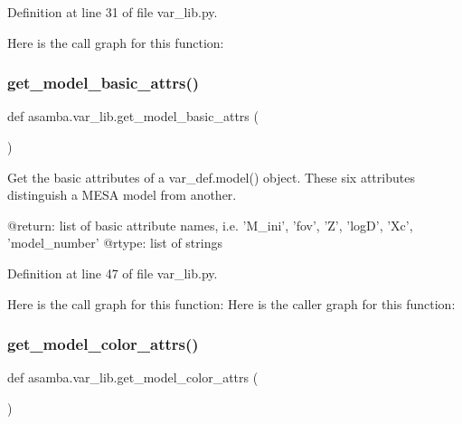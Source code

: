 Definition at line 31 of file var\+\_\+lib.\+py.

Here is the call graph for this function\+:
\mbox{\label{namespaceasamba_1_1var__lib_a300a7811388375b1f7a3267412235a28}} 
\subsubsection{\texorpdfstring{get\+\_\+model\+\_\+basic\+\_\+attrs()}{get\_model\_basic\_attrs()}}
{\footnotesize\ttfamily def asamba.\+var\+\_\+lib.\+get\+\_\+model\+\_\+basic\+\_\+attrs (\begin{DoxyParamCaption}{ }\end{DoxyParamCaption})}

\begin{DoxyVerb}Get the basic attributes of a var_def.model() object. These six attributes distinguish a MESA 
model from another.

@return: list of basic attribute names, i.e. 'M_ini', 'fov', 'Z', 'logD', 'Xc', 'model_number'
@rtype: list of strings
\end{DoxyVerb}
 

Definition at line 47 of file var\+\_\+lib.\+py.

Here is the call graph for this function\+:
Here is the caller graph for this function\+:
\mbox{\label{namespaceasamba_1_1var__lib_ac0c467d00e6be1fa027b3a79ef6ef2e2}} 
\subsubsection{\texorpdfstring{get\+\_\+model\+\_\+color\+\_\+attrs()}{get\_model\_color\_attrs()}}
{\footnotesize\ttfamily def asamba.\+var\+\_\+lib.\+get\+\_\+model\+\_\+color\+\_\+attrs (\begin{DoxyParamCaption}{ }\end{DoxyParamCaption})}

